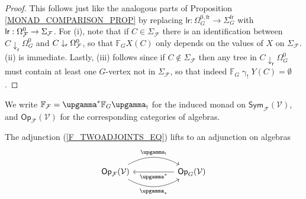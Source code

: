 \documentclass[a4paper,10pt]{article}%
\begin{document}
\begin{proof}
	This follows just like the analogous parts of
	Proposition \ref{MONAD_COMPARISON_PROP} by
	replacing
	$\mathsf{lr}: \Omega_G^{0,\text{fr}} \to \Sigma_G^{\text{fr}}$
	with
	$\mathsf{lr}: \Omega_{\mathcal F}^0 \to \Sigma_{\mathcal F}$. 
	For (i), note that if $C \in \Sigma_{\mathcal{F}}$
	there is an identification between
	$C \downarrow_{\mathsf r} \Omega_G^0$
	and
	$C \downarrow_{\mathsf r} \Omega_{\mathcal F}^0$,
	so that $\mathbb{F}_G X (C)$
	only depends on the values of $X$ on $\Sigma_{\mathcal{F}}$.
	(ii) is immediate.	
	Lastly, (iii) follows 
	since if $C \nin \Sigma_{\mathcal{F}}$ then
	any tree in $C \downarrow_{\mathsf r} \Omega_G^0$ must contain at least one $G$-vertex not in $\Sigma_{\mathcal{F}}$,
	so that indeed $\mathbb{F}_G \upgamma_{!}Y(C)=\emptyset$.
%        
\end{proof}

\begin{notation}
We write 
$\mathbb{F}_{\mathcal{F}} = \upgamma^{\**} \mathbb{F}_G \upgamma_!$ for the induced monad
on
$\mathsf{Sym}_{\mathcal{F}}(\mathcal{V})$,
and $\mathsf{Op}_{\mathcal{F}}(\mathcal{V})$
for the corresponding categories of algebras.
\end{notation}

\begin{corollary}\label{TWOADJOINTSOPF COR}
The adjunction (\ref{F_TWOADJOINTS_EQ}) lifts to an adjunction on algebras
\begin{equation}\label{TWOADJOINTSOPF EQ}
	\begin{tikzcd}[column sep =5em]
		\mathsf{Op}_\F(\mathcal{V})
			\arrow[r, bend left, "\upgamma_{!}"]
			\arrow[r, bend right, "\upgamma_{\**}"']
		&
		\mathsf{Op}_{G}(\mathcal{V})
		\arrow[l, "\upgamma^{\**}"]
	\end{tikzcd}
\end{equation}
\end{corollary}
\end{document}
